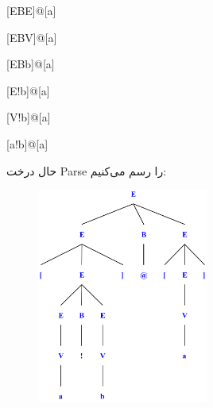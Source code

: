 \hspace{1em}{\LARGE $\rightarrow$} [EBE]@[a]

\hspace{1em}{\LARGE $\rightarrow$} [EBV]@[a]

\hspace{1em}{\LARGE $\rightarrow$} [EBb]@[a]

\hspace{1em}{\LARGE $\rightarrow$} [E!b]@[a]

\hspace{1em}{\LARGE $\rightarrow$} [V!b]@[a]

\hspace{1em}{\LARGE $\rightarrow$} [a!b]@[a]
\pagebreak
\setRTL

حال درخت Parse را رسم می‌کنیم:

\begin{figure}[htbp]
	\centering
	\includegraphics[width=0.5\textwidth]{1.png}
	
\end{figure}


